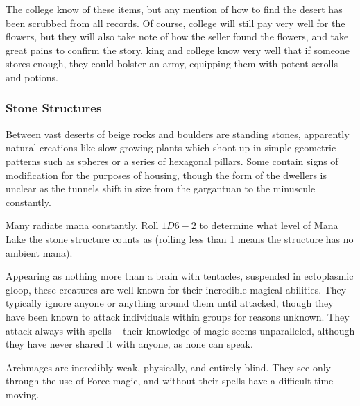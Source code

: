 \begin{multicols}{2}
%

The \gls{college} know of these items, but any mention of how to find the desert has been scrubbed from all records.
Of course, \gls{college} will still pay very well for the flowers, but they will also take note of how the seller found the flowers, and take great pains to confirm the story.
\Gls{king} and \gls{college} know very well that if someone stores enough, they could bolster an army, equipping them with potent scrolls and potions.

\boxPair[t]{
  \archmage
}{
  \rockman
}

\subsubsection{Stone Structures}

Between vast deserts of beige rocks and boulders are standing stones, apparently natural creations like slow-growing plants which shoot up in simple geometric patterns such as spheres or a series of hexagonal pillars.
Some contain signs of modification for the purposes of housing, though the form of the dwellers is unclear as the tunnels shift in size from the gargantuan to the minuscule constantly.

Many radiate mana constantly.
Roll $1D6-2$ to determine what level of Mana Lake the stone structure counts as (rolling less than 1 means the structure has no ambient mana).

\label{archmage}

Appearing as nothing more than a brain with tentacles, suspended in ectoplasmic gloop, these creatures are well known for their incredible magical abilities.
They typically ignore anyone or anything around them until attacked, though they have been known to attack individuals within groups for reasons unknown.
They attack always with spells -- their knowledge of magic seems unparalleled, although they have never shared it with anyone, as none can speak.

Archmages are incredibly weak, physically, and entirely blind.
They see only through the use of Force magic, and without their spells have a difficult time moving.


\end{multicols}
